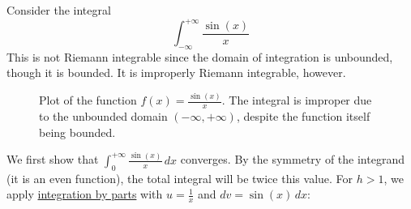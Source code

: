   \begin{example}
    \label{ex:sinc}
    Consider the integral 
    \begin{equation}
      \int_{-\infty}^{+\infty} \frac{\sin(x)}{x} 
    \end{equation}
    This is not Riemann integrable since the domain of integration is unbounded, though it is bounded. It is improperly Riemann integrable, however. 

    \begin{figure}[H]
      \centering 
      \caption{Plot of the function $f(x) = \frac{\sin(x)}{x}$. The integral is improper due to the unbounded domain $(-\infty, +\infty)$, despite the function itself being bounded.} 
      \label{fig:sinc_integral}
    \end{figure}

    We first show that $\int_0^{+\infty} \frac{\sin(x)}{x} \, dx$ converges. By the symmetry of the integrand (it is an even function), the total integral will be twice this value. For $h > 1$, we apply \hyperref[thm:integration-by-parts]{integration by parts} with $u = \frac{1}{x}$ and $dv = \sin(x) \, dx$:
    

\end{example}
